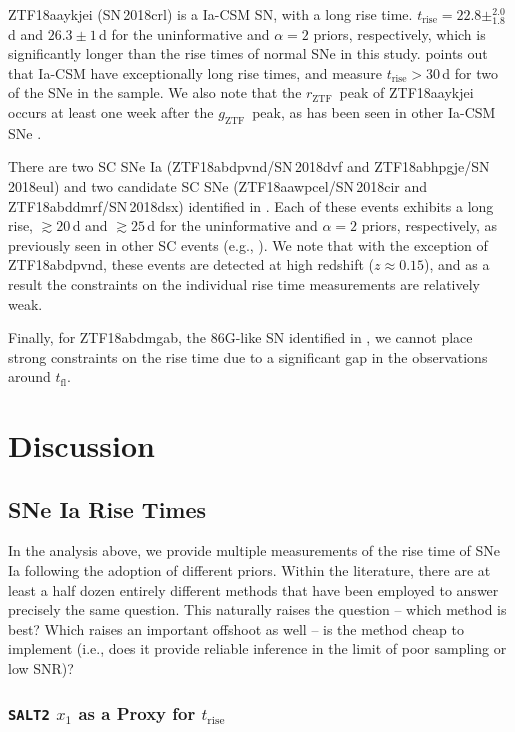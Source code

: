 \documentclass[twocolumn]{./aastex63}
\newcommand{\rztf}{$r_\mathrm{ZTF}$}
\newcommand{\gztf}{$g_\mathrm{ZTF}$}
\newcommand{\tfl}{$t_\mathrm{fl}$}
\newcommand{\trise}{$t_\mathrm{rise}$}
\begin{document}
ZTF18aaykjei (SN\,2018crl) is a Ia-CSM SN, with a long rise time. \trise$ = 22.8
\pm^{2.0}_{1.8}$\,d and $26.3 \pm 1$\,d for the uninformative and $\alpha = 2$
priors, respectively, which is significantly longer than the rise times of
normal SNe in this study. \citet{Silverman13} points out that Ia-CSM have
exceptionally long rise times, and \citet{Firth15} measure \trise$ > 30$\,d for
two of the SNe in the \citeauthor{Silverman13} sample. We also note that the
\rztf\ peak of ZTF18aaykjei occurs at least one week after the \gztf\ peak, as
has been seen in other Ia-CSM SNe \citep{aldering05gj,prieto05gj}.

There are two SC SNe Ia (ZTF18abdpvnd/SN\,2018dvf and ZTF18abhpgje/SN\,2018eul)
and two candidate SC SNe (ZTF18aawpcel/SN\,2018cir and ZTF18abddmrf/SN\,2018dsx)
identified in \citet{Yao19}. Each of these events exhibits a long rise, $\gtrsim
20$\,d and $\gtrsim 25$\,d for the uninformative and $\alpha=2$ priors,
respectively, as previously seen in other SC events (e.g.,
\citealt{Scalzo10,Silverman11}). We note that with the exception of
ZTF18abdpvnd, these events are detected at high redshift ($z \approx 0.15$), and
as a result the constraints on the individual rise time measurements are
relatively weak.

Finally, for ZTF18abdmgab, the 86G-like SN identified in \citet{Yao19}, we
cannot place strong constraints on the rise time due to a significant gap in the
observations around \tfl.

\section{Discussion}

\subsection{SNe Ia Rise Times}

In the analysis above, we provide multiple measurements of the rise time of SNe
Ia following the adoption of different priors. Within the literature, there are
at least a half dozen entirely different methods that have been employed to
answer precisely the same question. This naturally raises the question -- which
method is best? Which raises an important offshoot as well -- is the method
cheap to implement (i.e., does it provide reliable inference in the limit of
poor sampling or low SNR)?

\subsubsection{\texttt{SALT2} $x_1$ as a Proxy for \trise}\label{sec:x1_rise}
\end{document}
